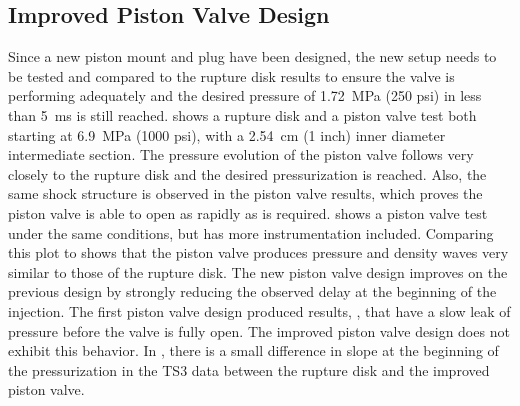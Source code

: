 
\subsection{Improved Piston Valve Design}



Since a new piston mount and plug have been designed, the new setup needs to be tested and compared to the rupture disk results to ensure the valve is performing adequately and the desired pressure of \SI{1.72}{\mega\pascal} (250 psi) in less than \SI{5}{\milli\second} is still reached.  shows a rupture disk and a piston valve test both starting at \SI{6.9}{\mega\pascal} (1000 psi), with a \SI{2.54}{\centi\meter} (1 inch) inner diameter intermediate section. The pressure evolution of the piston valve follows very closely to the rupture disk and the desired pressurization is reached. Also, the same shock structure is observed in the piston valve results, which proves the piston valve is able to open as rapidly as is required.  shows a piston valve test under the same conditions, but has more instrumentation included. Comparing this plot to  shows that the piston valve produces pressure and density waves very similar to those of the rupture disk. The new piston valve design improves on the previous design by strongly reducing the observed delay at the beginning of the injection. The first piston valve design produced results, , that have a slow leak of pressure before the valve is fully open. The improved piston valve design does not exhibit this behavior. In , there is a small difference in slope at the beginning of the pressurization in the TS3 data between the rupture disk and the improved piston valve. 


